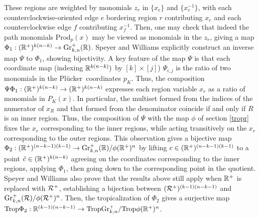 \documentclass[12pt,letter]{article}
\newcommand{\gr}{\mathrm{Gr}}
\newcommand{\trop}{\mathrm{Trop}}
\newcommand{\prad}{\mathrm{Prod}}
\newcommand{\plu}{Pl\"ucker~}
\begin{document}
  These regions are weighted by monomials $z_r$ in $\{x_e\}$ and $\{x_e^{-1}\}$, with each counterclockwise-oriented edge $e$ bordering region $r$ contributing $x_e$ and each counterclockwise edge $f$ contributing $x_f^{-1}$. Then, one may check that indeed the path monomials $\prad_p(x)$ may be viewed as monomials in the $z_r$, giving a map $\Phi_1:(\RR^+)^{k(n-k)}\to \gr_{k,n}^+(\RR)$.
  Speyer and Williams explicitly construct an inverse map $\Psi$ to $\Phi_1$, showing bijectivity. 
  A key feature of the map $\Psi$ is that each coordinate map (indexing ${\mathbb R}^{k(n-k)})$ by $[k]\times [j]$) $\Psi_{i,j}$ is the ratio of two monomials in the \plu coordinates $p_{K}$. Thus, the composition $\Psi\Phi_1:({\mathbb R}^+)^{k(n-k)}\to({\mathbb R}^+)^{k(n-k)}$ expresses each region variable $x_r$ as a ratio of monomials in $P_K(x)$. In particular, the multiset formed from the indices of the numerator of $x_R$ and that formed from the denominator coincide if and only if $R$ is an inner region. Thus, the composition of $\Psi$ with the map $\phi$ of section \ref{tropr} fixes the $x_r$ corresponding to the inner regions, while acting transitively on the $x_r$ corresponding to the outer regions. This observation gives a bijective map $\Phi_2:(\RR^+)^{(n-k-1)(k-1)}\to\gr^+_{k,n}(\RR) /\phi(\RR^+)^n$ by lifting $c\in ({\mathbb R}^+)^{(n-k-1)(k-1)}$ to a point $\tilde{c}\in ({\mathbb R}^+)^{k(n-k)}$ agreeing on the coordinates corresponding to the inner regions, applying $\Phi_1$, then going down to the corresponding point in the quotient. Speyer and Williams also prove that the results above still apply when ${\mathbb R}^+$ is replaced with ${\mathcal R}^+$, establishing a bijection between $({\mathcal R}^+)^{(k-1)(n-k-1)}$ and $\gr_{k,n}^+(\Rcal)/\phi(\Rcal^+)^n$. Then, the tropicalization of $\Phi_2$ gives a surjective map $\trop\Phi_2:\RR^{(k-1)(n-k-1)}\to \trop\gr_{k,n}^+/\trop\phi(\RR^+)^n$.
  
\end{document}
